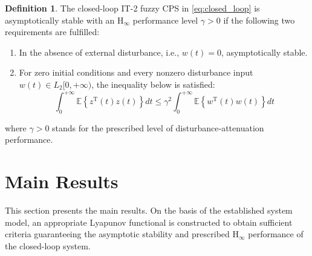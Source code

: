 \documentclass[preprint,review,fleqn,sort&compress,3p]{elsarticle}
\theoremstyle{definition} %
\theoremstyle{definition}%
\newtheorem{Def}{Definition}[section]
\newif\ifreviewmarkup
\DeclareRobustCommand{\revdel}[1]{\ifreviewmarkup{\color{revisionred}\hypersetup{linkcolor=revisionred,citecolor=revisionred}#1}\fi}
\DeclareRobustCommand{\revadd}[1]{{\ifreviewmarkup\color{revisiongreen}\hypersetup{linkcolor=revisiongreen,citecolor=revisiongreen}\fi#1}}
\begin{document}
\begin{Def}\label{Def1}
	The closed-loop IT-2 fuzzy CPS in \eqref{eq:closed_loop} is asymptotically stable with an $\mathrm{H}_\infty$ performance level $\gamma>0$ if the following two requirements are fulfilled:
	
	\begin{enumerate}
\label{rev:M27}		\item In the absence of external disturbance, i.e., $w(t)=0$, \revdel{the resultant IT-2 fuzzy CPSs \eqref{eq:closed_loop} is} asymptotically stable.
		
		\item For zero initial conditions and every nonzero disturbance input $w(t)\in L_2[0,+\infty)$, the inequality below is satisfied:
		\begin{equation}
			\int_0^{+\infty}
			\mathbb E\left\{
			z^\mathrm{T}(t)z(t)
			\right\}dt
			\le
			\gamma^2
			\int_0^{+\infty}
			\mathbb E\left\{
			w^\mathrm{T}(t)w(t)
			\right\}dt
		\end{equation}
	\end{enumerate}
	where $\gamma>0$ stands for the prescribed level of disturbance‑attenuation performance.

\end{Def}

\section{Main Results}\label{sec3}
This section presents the main results. On the basis of the established system model, an appropriate Lyapunov functional is constructed to obtain sufficient criteria guaranteeing the asymptotic stability and prescribed $\mathrm{H}_\infty$ performance of the closed-loop system.
\end{document}
